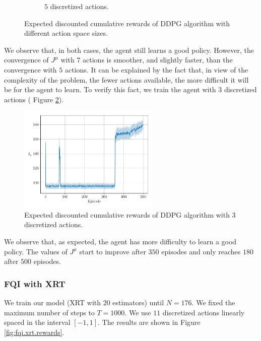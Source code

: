 \documentclass[a4paper, 12pt]{article}
\begin{document}
\begin{figure}[H]
\begin{subfigure}{0.49\textwidth}
            \caption{$5$ discretized actions.}
        \end{subfigure}
        \caption{Expected discounted cumulative rewards of DDPG algorithm with different action space sizes.}
        \label{fig:ddpg.rewards.size}
    \end{figure}
    
    We observe that, in both cases, the agent still learns a good policy. However, the convergence of $J^{\mu}$ with $7$ actions is smoother, and slightly faster, than the convergence with $5$ actions. It can be explained by the fact that, in view of the complexity of the problem, the fewer actions available, the more difficult it will be for the agent to learn. To verify this fact, we train the agent with $3$ discretized actions (\cf{} Figure \ref{fig:ddpg.rewards.size.3}).
    
    \begin{figure}[H]
        \centering
        \includegraphics[width=0.6\textwidth]{resources/pdf/ddpg_J_3_1_0.95.pdf}
        \caption{Expected discounted cumulative rewards of DDPG algorithm with $3$ discretized actions.}
        \label{fig:ddpg.rewards.size.3}
    \end{figure}
    
    We observe that, as expected, the agent has more difficulty to learn a good policy. The values of $J^{\mu}$ start to improve after $\num{350}$ episodes and only reaches $\num{180}$ after $\num{500}$ episodes.
    
    \subsubsection{FQI with XRT}
    
    We train our model (XRT with $20$ estimators) until $N = \num{176}$. We fixed the maximum number of steps to $T = \num{1000}$. We use $11$ discretized actions linearly spaced in the interval $[-1, 1]$. The results are shown in Figure \ref{fig:fqi.xrt.rewards}.
    
\end{document}
